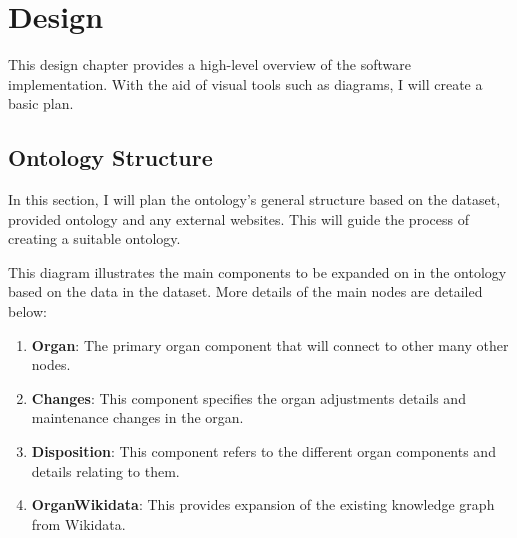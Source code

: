 \chapter{Design}
This design chapter provides a high-level overview of the software implementation. With the aid of visual tools such as diagrams, I will create a basic plan. 

\section{Ontology Structure}
In this section, I will plan the ontology's general structure based on the dataset, provided ontology and any external websites. This will guide the process of creating a suitable ontology.  

\bigskip
\begin{center}
\end{center}

This diagram illustrates the main components to be expanded on in the ontology based on the data in the dataset. More details of the main nodes are detailed below:

\begin{enumerate}
    \item \textbf{Organ}: The primary organ component that will connect to other many other nodes.
    \item \textbf{Changes}: This component specifies the organ adjustments details and maintenance changes in the organ.
    \item \textbf{Disposition}: This component refers to the different organ components and details relating to them.
    \item \textbf{OrganWikidata}: This provides expansion of the existing knowledge graph from Wikidata.
\end{enumerate}

